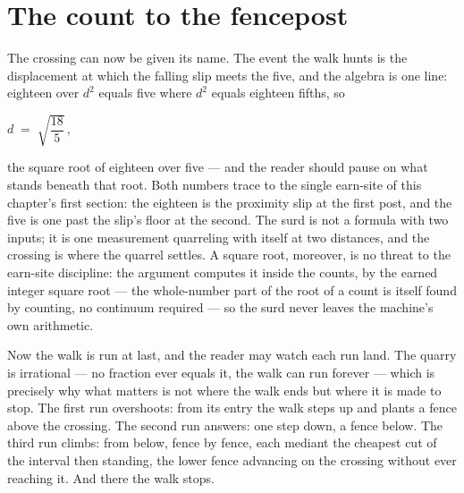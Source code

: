 \section{The count to the fencepost}

The crossing can now be given its name. The event the walk hunts is the displacement
at which the falling slip meets the five, and the algebra is one line: eighteen over
$d^2$ equals five where $d^2$ equals eighteen fifths, so

\begin{center}
$d \;=\; \sqrt{\dfrac{18}{5}}\,,$
\end{center}

the square root of eighteen over five --- and the reader should pause on what stands
beneath that root. Both numbers trace to the single earn-site of this chapter's first
section: the eighteen is the proximity slip at the first post, and the five is one
past the slip's floor at the second. The surd is not a formula with two inputs; it is
one measurement quarreling with itself at two distances, and the crossing is where the
quarrel settles. A square root, moreover, is no threat to the earn-site discipline:
the argument computes it inside the counts, by the earned integer square root --- the
whole-number part of the root of a count is itself found by counting, no continuum
required --- so the surd never leaves the machine's own arithmetic.

Now the walk is run at last, and the reader may watch each run land. The quarry is
irrational --- no fraction ever equals it, the walk can run forever --- which is
precisely why what matters is not where the walk ends but where it is made to stop.
The first run overshoots: from its entry the walk steps up and plants a fence above
the crossing. The second run answers: one step down, a fence below. The third run
climbs: from below, fence by fence, each mediant the cheapest cut of the interval
then standing, the lower fence advancing on the crossing without ever reaching it.
And there the walk stops.

